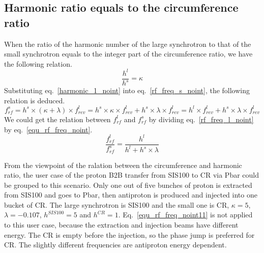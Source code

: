 \subsection{Harmonic ratio equals to the circumference ratio}
When the ratio of the harmonic number of the large synchrotron to that of the small synchrotron equals to the integer part of the circumference ratio, we have the following relation.
\begin{equation}
\frac {h^{l}}{h^{s}}= \kappa  \label{harmonic_1_noint}
\end{equation}
Substituting eq.~\ref{harmonic_1_noint} into  eq.~\ref{rf_freq_s_noint}, the following relation is deduced. 
\begin{equation} 
f_{rf}^{s}=h^s \times (\kappa+ \lambda) \times f_{rev}^{l} =h^s \times \kappa \times f_{rev}^{l}+ h^s \times \lambda \times f_{rev}^{l}=h^l\times f_{rev}^{l} + h^s \times \lambda \times f_{rev}^{l} \label{equ_rf_freq_noint}
\end{equation}
We could get the relation between $f_{rf}^{l}$ and $f_{rf}^{s}$ by dividing eq.~\ref{rf_freq_l_noint} by eq.~\ref{equ_rf_freq_noint}. 
\begin{equation} 
\frac{f_{rf}^{l}}{f_{rf}^{s}}=\frac{h^l}{h^l+ h^s \times \lambda}\label{equ_rf_freq_noint11}
\end{equation}

From the viewpoint of the ralation between the circumference and harmonic ratio, the user case of the proton B2B transfer from SIS100 to CR via Pbar could be grouped to this scenario. Only one out of five bunches of proton is extracted from SIS100 and goes to Pbar, then antiproton is produced and injected into one bucket of CR. The large synchrotron is SIS100 and the small one is CR, $\kappa=5$, $\lambda=-0.107$, $h^{SIS100}=5$ and $h^{CR}=1$. Eq.~\ref{equ_rf_freq_noint11} is not applied to this user case, because the extraction and injection beams have different energy. The CR is empty before the injection, so the phase jump is preferred for CR. The slightly different frequencies are antiproton energy dependent.




